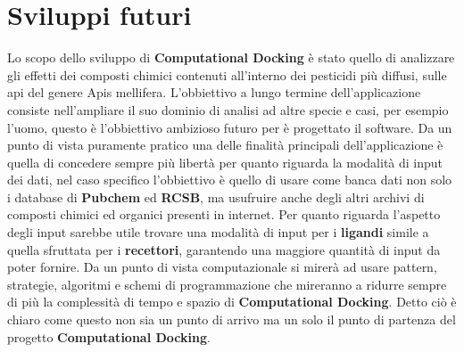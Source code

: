 \section{Sviluppi futuri}
Lo scopo dello sviluppo di \textbf{Computational Docking} è stato quello di analizzare gli effetti dei composti chimici contenuti all'interno dei pesticidi più diffusi, sulle api del genere Apis mellifera. L'obbiettivo a lungo termine dell'applicazione consiste nell'ampliare il suo dominio di analisi ad altre specie e casi, per esempio l'uomo, questo è l'obbiettivo ambizioso futuro per è progettato il software.\newline
Da un punto di vista puramente pratico una delle finalità principali dell'applicazione è quella di concedere sempre più libertà per quanto riguarda la modalità di input dei dati, nel caso specifico l'obbiettivo è quello di usare come banca dati non solo i database di \textbf{Pubchem} ed \textbf{RCSB}, ma usufruire anche degli altri archivi di composti chimici ed organici presenti in internet. Per quanto riguarda l'aspetto degli input sarebbe utile trovare una modalità di input per i \textbf{ligandi} simile a quella sfruttata per i \textbf{recettori}, garantendo una maggiore quantità di input da poter fornire.\newline
Da un punto di vista computazionale si mirerà ad usare pattern, strategie, algoritmi e schemi di programmazione che mireranno a ridurre sempre di più la complessità di tempo e spazio di \textbf{Computational Docking}.\newline
Detto ciò è chiaro come questo non sia un punto di arrivo ma un solo il punto di partenza del progetto \textbf{Computational Docking}.










































